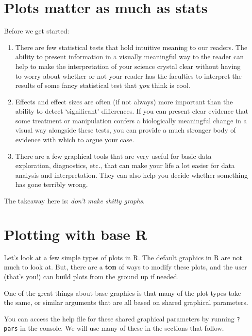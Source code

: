 \documentclass[
]{book}
\begin{document}
\hypertarget{plots-matter-as-much-as-stats}{%
\section{Plots matter as much as stats}\label{plots-matter-as-much-as-stats}}

Before we get started:

\begin{enumerate}
\def\labelenumi{\arabic{enumi}.}
\item
  There are few statistical tests that hold intuitive meaning to our readers. The ability to present information in a visually meaningful way to the reader can help to make the interpretation of your science crystal clear without having to worry about whether or not your reader has the faculties to interpret the results of some fancy statistical test that \emph{you} think is cool.
\item
  Effects and effect sizes are often (if not always) more important than the ability to detect `significant' differences. If you can present clear evidence that some treatment or manipulation confers a biologically meaningful change in a visual way alongside these tests, you can provide a much stronger body of evidence with which to argue your case.
\item
  There are a few graphical tools that are very useful for basic data exploration, diagnostics, etc., that can make your life a lot easier for data analysis and interpretation. They can also help you decide whether something has gone terribly wrong.
\end{enumerate}

The takeaway here is: \emph{don't make shitty graphs}.

\hypertarget{base-graphics}{%
\section{Plotting with base R}\label{base-graphics}}

Let's look at a few simple types of plots in R. The default graphics in R are not much to look at. But, there are a \textbf{ton} of ways to modify these plots, and the user (that's you!) can build plots from the ground up if needed.

One of the great things about base graphics is that many of the plot types take the same, or similar arguments that are all based on shared graphical parameters.

You can access the help file for these shared graphical parameters by running \texttt{?pars} in the console. We will use many of these in the sections that follow.
\end{document}
